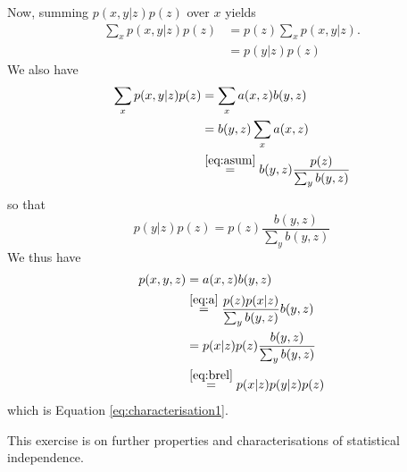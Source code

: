 \begin{solution}
  Now, summing $p(x,y | z) p(z)$ over $x$ yields
   \begin{align}
     \sum_x  p(x,y | z) p(z) & =  p(z) \sum_x p(x,y|z). \\
     & = p(y | z) p(z)
   \end{align}
   We also have
    \begin{align}
      \sum_x  p(x,y | z) p(z) &= \sum_x a(x,z) b(y,z) \\
      &= b(y,z) \sum_x a(x,z) \\
    &\stackrel{\eqref{eq:asum}}{=} b(y,z) \frac{p(z)}{\sum_y b(y,z)}
    \end{align}
    so that
    \begin{equation}
      p(y | z) p(z) =  p(z) \frac{b(y,z)}{\sum_y b(y,z)}
      \label{eq:brel}
    \end{equation}
   We thus have
   \begin{align}
     p(x,y,z) & = a(x,z) b(y,z) \\
     &  \stackrel{\eqref{eq:a}}{=} \frac{p(z) p(x | z)}{\sum_y b(y,z)} b(y,z) \\
     & = p(x | z)p(z) \frac{ b(y,z)}{\sum_y b(y,z)} \\
     & \stackrel{\eqref{eq:brel}}{=} p(x|z) p(y|z) p(z)
   \end{align}
   which is Equation \eqref{eq:characterisation1}.
  \end{solution}


\label{ex:independencies2}
This exercise is on further properties and characterisations of statistical independence.

